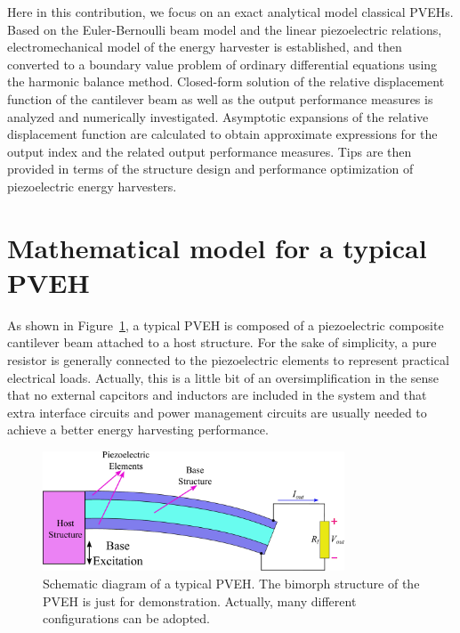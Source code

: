 \documentclass{article}
\begin{document}
Here in this contribution, we focus on an exact analytical model classical PVEHs. Based on the Euler-Bernoulli beam model and the linear piezoelectric relations, electromechanical model of the energy harvester is established, and then converted to a boundary value problem of ordinary differential equations using the harmonic balance method. Closed-form solution of the relative displacement function of the cantilever beam as well as the output performance measures is analyzed and numerically investigated. Asymptotic expansions of the relative displacement function are calculated to obtain approximate expressions for the output index and the related output performance measures. Tips are then provided in terms of the structure design and performance optimization of piezoelectric energy harvesters. 


\section{Mathematical model for a typical PVEH}

As shown in Figure~\ref{fig:fig_pveh}, a typical PVEH is composed of a piezoelectric composite cantilever beam attached to a host structure. For the sake of simplicity, a pure resistor is generally connected to the piezoelectric elements to represent practical electrical loads. Actually, this is a little bit of an oversimplification in the sense that no external capcitors and inductors are included in the system and that extra interface circuits and power management circuits are usually needed to achieve a better energy harvesting performance. \cite{shu2006analysis,shu2007improved,qiu2009comparison} 

\begin{figure}[!htbp]
    \centering
    \includegraphics[width=0.8\textwidth]{./img_eig_asy/fig_pveh}
    \caption{Schematic diagram of a typical PVEH. The bimorph structure of the PVEH is just for demonstration. Actually, many different configurations can be adopted. }
    \label{fig:fig_pveh}
\end{figure}
\end{document}
